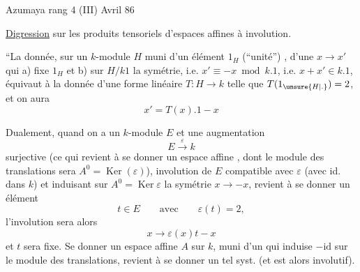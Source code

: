 Azumaya rang $4$ \quad (III) \hfill Avril $86$

\uline{Digression} sur les produits tensoriels d'espaces affines à involution.

``La donnée, sur un $k$-module $H$ muni d'un élément $1_H$ (``unité'') , d'une   $x\longrightarrow x'$ qui a) fixe $1_H$ et b)  sur $H/k1$ la symétrie, i.e. $x'\equiv-x\bmod k.1$, i.e. $x+x'\in k.1$, équivaut à la donnée d'une forme linéaire $T:H\longrightarrow k$ telle que $T(1_{\unsure{H|.}})=2$, et on aura
\[
 x'=T(x).1-x
\]

Dualement,  quand on a un $k$-module $E$ et une augmentation
\[
 E\xrightarrow{\varepsilon} k
\]
surjective (ce qui revient à se donner un espace affine , dont le module des translations sera $A^0=\operatorname{Ker}(\varepsilon)$),   involution de $E$ compatible avec $\varepsilon$ (avec id. dans $k$) et induisant sur $A^0=\operatorname{Ker}\varepsilon$ la symétrie $x\longrightarrow-x$, revient à se donner un élément
\[
 t\in E\qquad\text{avec}\qquad\varepsilon(t)=2,
\]
l'involution sera alors
\[
 x\longrightarrow\varepsilon(x)t-x
\]
et $t$ sera fixe. Se donner un espace affine $A$ sur $k$, muni d'un   qui induise $-\mathrm{id}$ sur le module des translations, revient à se donner un tel syst. (et   est alors involutif).

